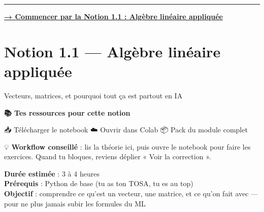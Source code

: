 \documentclass[
  french,
  11pt,
  a4paper,
]{scrbook}
\begin{document}
\begin{center}\rule{0.5\linewidth}{0.5pt}\end{center}

\href{notion_1_1_algebre_lineaire.qmd}{\textbf{→ Commencer par la Notion
1.1 : Algèbre linéaire appliquée}}

\chapter{Notion 1.1 --- Algèbre linéaire
appliquée}\label{notion-1.1-alguxe8bre-linuxe9aire-appliquuxe9e}

Vecteurs, matrices, et pourquoi tout ça est partout en IA

\hfill\break

\begin{tcolorbox}[enhanced jigsaw, arc=.35mm, bottomrule=.15mm, breakable, colback=white, colframe=quarto-callout-note-color-frame, left=2mm, leftrule=.75mm, opacityback=0, rightrule=.15mm, toprule=.15mm]

\vspace{-3mm}\textbf{📚 Tes ressources pour cette notion}\vspace{3mm}

📥 Télécharger le notebook ☁️ Ouvrir dans Colab 📦 Pack du module
complet

💡 \textbf{Workflow conseillé} : lis la théorie ici, puis ouvre le
notebook pour faire les exercices. Quand tu bloques, reviens déplier «
Voir la correction ».

\end{tcolorbox}

\begin{tcolorbox}[enhanced jigsaw, arc=.35mm, bottomrule=.15mm, breakable, colback=white, colframe=quarto-callout-note-color-frame, left=2mm, leftrule=.75mm, opacityback=0, rightrule=.15mm, toprule=.15mm]
\begin{minipage}[t]{5.5mm}
\textcolor{quarto-callout-note-color}{\faInfo}
\end{minipage}%
\begin{minipage}[t]{\textwidth - 5.5mm}

\textbf{Durée estimée} : 3 à 4 heures\\
\textbf{Prérequis} : Python de base (tu as ton TOSA, tu es au top)\\
\textbf{Objectif} : comprendre ce qu'est un vecteur, une matrice, et ce
qu'on fait avec --- pour ne plus jamais subir les formules du ML

\end{minipage}%
\end{tcolorbox}
\end{document}

